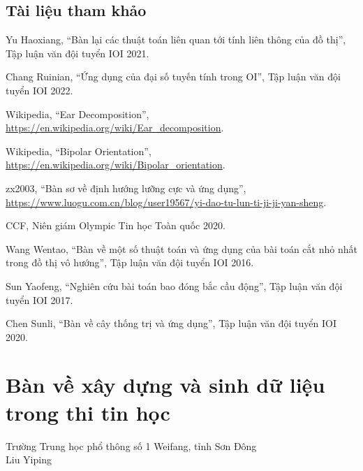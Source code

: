 \documentclass[11pt]{article}
\begin{document}
\subsection{Tài liệu tham khảo}

\begin{enumerate}[label={[\arabic*]}]
  \item Yu Haoxiang, ``Bàn lại các thuật toán liên quan tới tính liên thông của
  đồ thị'', Tập luận văn đội tuyển IOI 2021.
  \item Chang Ruinian, ``Ứng dụng của đại số tuyến tính trong OI'', Tập luận văn
  đội tuyển IOI 2022.
  \item Wikipedia, ``Ear Decomposition'',
  \url{https://en.wikipedia.org/wiki/Ear_decomposition}.
  \item Wikipedia, ``Bipolar Orientation'',
  \url{https://en.wikipedia.org/wiki/Bipolar_orientation}.
  \item zx2003, ``Bàn sơ về định hướng lưỡng cực và ứng dụng'',
  \url{https://www.luogu.com.cn/blog/user19567/yi-dao-tu-lun-ti-ji-ji-yan-sheng}.
  \item CCF, Niên giám Olympic Tin học Toàn quốc 2020.
  \item Wang Wentao, ``Bàn về một số thuật toán và ứng dụng của bài toán cắt nhỏ
  nhất trong đồ thị vô hướng'', Tập luận văn đội tuyển IOI 2016.
  \item Sun Yaofeng, ``Nghiên cứu bài toán bao đóng bắc cầu động'', Tập luận văn
  đội tuyển IOI 2017.
  \item Chen Sunli, ``Bàn về cây thống trị và ứng dụng'', Tập luận văn đội tuyển
  IOI 2020.
\end{enumerate}

\section{Bàn về xây dựng và sinh dữ liệu trong thi tin học}

\begin{center}
Trường Trung học phổ thông số 1 Weifang, tỉnh Sơn Đông\\
Liu Yiping
\end{center}

\renewcommand{\abstractname}{Tóm tắt}
\begin{abstract}
Bài viết này giới thiệu các phương pháp sinh ngẫu nhiên và xây dựng nhiều loại
dữ liệu như dãy, cây, đồ thị, xâu ngoặc, đồng thời trình bày các lỗi hash
thường gặp và cách xây dựng dữ liệu tương ứng.
\end{abstract}
\end{document}
